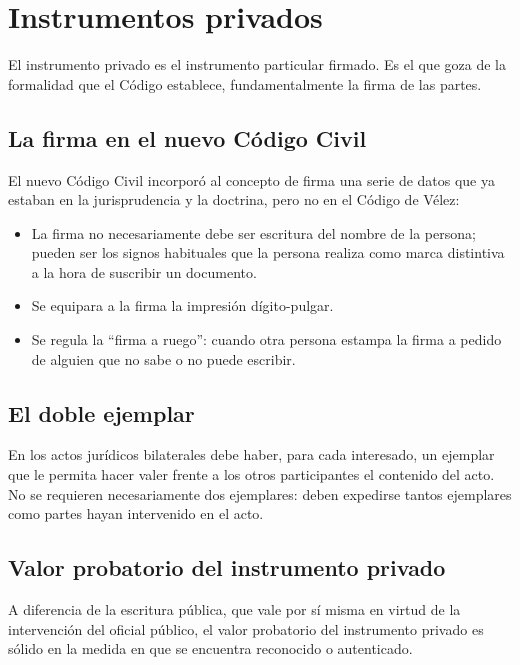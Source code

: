 \documentclass[12pt,oneside]{book}
\begin{document}
\section{Instrumentos privados}

El instrumento privado es el instrumento particular firmado. Es el que goza de la formalidad que el Código establece, fundamentalmente la firma de las partes.

\subsection{La firma en el nuevo Código Civil}

El nuevo Código Civil incorporó al concepto de firma una serie de datos que ya estaban en la jurisprudencia y la doctrina, pero no en el Código de Vélez:

\begin{itemize}
    \item La firma no necesariamente debe ser escritura del nombre de la persona; pueden ser los signos habituales que la persona realiza como marca distintiva a la hora de suscribir un documento.
    \item Se equipara a la firma la impresión dígito-pulgar.
    \item Se regula la ``firma a ruego'': cuando otra persona estampa la firma a pedido de alguien que no sabe o no puede escribir.
\end{itemize}

\subsection{El doble ejemplar}

En los actos jurídicos bilaterales debe haber, para cada interesado, un ejemplar que le permita hacer valer frente a los otros participantes el contenido del acto. No se requieren necesariamente dos ejemplares: deben expedirse tantos ejemplares como partes hayan intervenido en el acto.

\subsection{Valor probatorio del instrumento privado}

A diferencia de la escritura pública, que vale por sí misma en virtud de la intervención del oficial público, el valor probatorio del instrumento privado es sólido en la medida en que se encuentra reconocido o autenticado.
\end{document}
